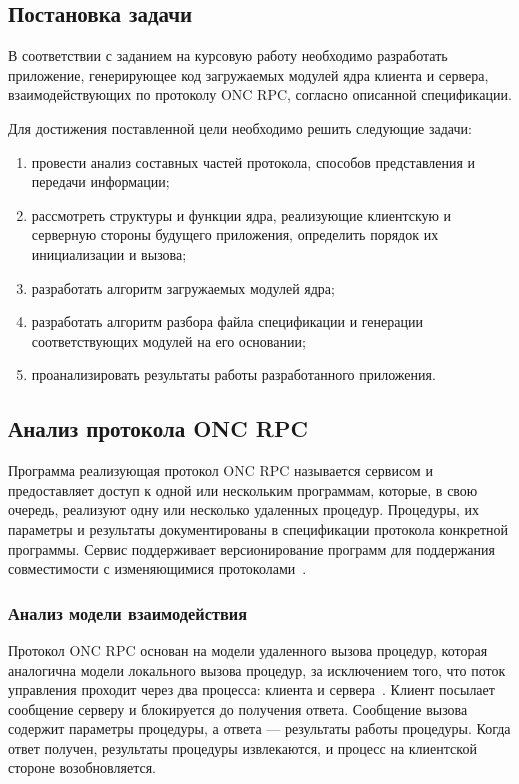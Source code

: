 
\vspace{-1\baselineskip}

\subsection{Постановка задачи}

В соответствии с заданием на курсовую работу необходимо разработать приложение,
генерирующее код загружаемых модулей ядра клиента и сервера, взаимодействующих
по протоколу ONC RPC, согласно описанной спецификации.

Для достижения поставленной цели необходимо решить следующие задачи:
\begin{enumerate}
    \item провести анализ составных частей протокола, способов представления и
          передачи информации;
    \item рассмотреть структуры и функции ядра, реализующие клиентскую и
          серверную стороны будущего приложения, определить порядок их
          инициализации и вызова;
    \item разработать алгоритм загружаемых модулей ядра;
    \item разработать алгоритм разбора файла спецификации и генерации
          соответствующих модулей на его основании;
    \item проанализировать результаты работы разработанного приложения.
\end{enumerate}

\subsection{Анализ протокола ONC RPC}

Программа реализующая протокол ONC RPC называется сервисом и предоставляет
доступ к одной или нескольким программам, которые, в свою очередь, реализуют
одну или несколько удаленных процедур. Процедуры, их параметры и результаты
документированы в спецификации протокола конкретной программы. Сервис
поддерживает версионирование программ для поддержания совместимости с
изменяющимися протоколами~\cite{rfc5531}.

\subsubsection{Анализ модели взаимодействия}

Протокол ONC RPC основан на модели удаленного вызова процедур, которая
аналогична модели локального вызова процедур, за исключением того, что поток
управления проходит через два процесса: клиента и сервера~\cite{rfc5531}.
Клиент посылает сообщение серверу и блокируется до получения ответа. Сообщение
вызова содержит параметры процедуры, а ответа --- результаты работы процедуры.
Когда ответ получен, результаты процедуры извлекаются, и процесс на клиентской
стороне возобновляется.

